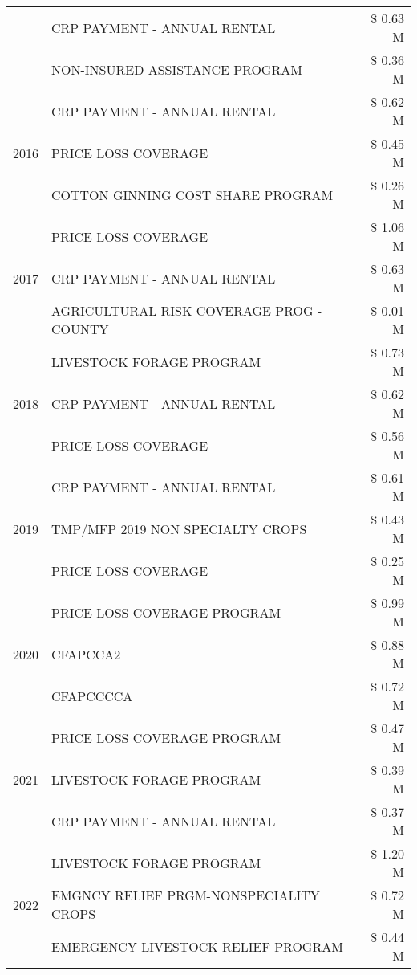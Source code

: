 \begin{tabular}{llr}
 & CRP PAYMENT - ANNUAL RENTAL & \$ 0.63 M \\
 & NON-INSURED ASSISTANCE PROGRAM & \$ 0.36 M \\
\cline{1-3}
\multirow[t]{3}{*}{2016} & CRP PAYMENT - ANNUAL RENTAL & \$ 0.62 M \\
 & PRICE LOSS COVERAGE & \$ 0.45 M \\
 & COTTON GINNING COST SHARE PROGRAM & \$ 0.26 M \\
\cline{1-3}
\multirow[t]{3}{*}{2017} & PRICE LOSS COVERAGE & \$ 1.06 M \\
 & CRP PAYMENT - ANNUAL RENTAL & \$ 0.63 M \\
 & AGRICULTURAL RISK COVERAGE PROG - COUNTY & \$ 0.01 M \\
\cline{1-3}
\multirow[t]{3}{*}{2018} & LIVESTOCK FORAGE PROGRAM & \$ 0.73 M \\
 & CRP PAYMENT - ANNUAL RENTAL & \$ 0.62 M \\
 & PRICE LOSS COVERAGE & \$ 0.56 M \\
\cline{1-3}
\multirow[t]{3}{*}{2019} & CRP PAYMENT - ANNUAL RENTAL & \$ 0.61 M \\
 & TMP/MFP 2019 NON SPECIALTY CROPS & \$ 0.43 M \\
 & PRICE LOSS COVERAGE & \$ 0.25 M \\
\cline{1-3}
\multirow[t]{3}{*}{2020} & PRICE LOSS COVERAGE PROGRAM & \$ 0.99 M \\
 & CFAPCCA2 & \$ 0.88 M \\
 & CFAPCCCCA & \$ 0.72 M \\
\cline{1-3}
\multirow[t]{3}{*}{2021} & PRICE LOSS COVERAGE PROGRAM & \$ 0.47 M \\
 & LIVESTOCK FORAGE PROGRAM & \$ 0.39 M \\
 & CRP PAYMENT - ANNUAL RENTAL & \$ 0.37 M \\
\cline{1-3}
\multirow[t]{3}{*}{2022} & LIVESTOCK FORAGE PROGRAM & \$ 1.20 M \\
 & EMGNCY RELIEF PRGM-NONSPECIALITY CROPS & \$ 0.72 M \\
 & EMERGENCY LIVESTOCK RELIEF PROGRAM & \$ 0.44 M \\
\cline{1-3}
\bottomrule
\end{tabular}
